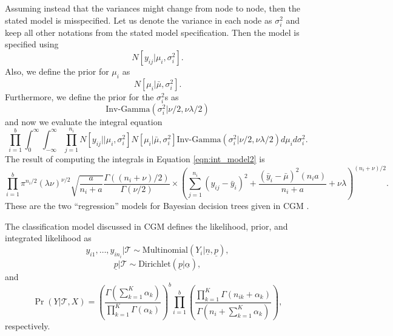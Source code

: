 \documentclass{article}
\renewcommand{\vec}[1]{\underline{{#1}}}
\begin{document}
Assuming instead that the variances might change from node to node, then the stated model is misspecified. Let us denote the variance in each node as $\sigma_i^2$ and keep all other notations from the stated model specification. Then the model is specified using 
\begin{equation}\label{eqn:normal_likelihood_many_variance}
N[y_{ij} \vert \mu_i, \sigma_i^2].
\end{equation}
Also, we define the prior for $\mu_i$ as 
\begin{equation}\label{eqn:multi_variance_prior}
N[\mu_i\vert \bar{\mu}, \sigma_i^2 ].
\end{equation}
Furthermore, we define the prior for the $\sigma_i^2$s as 
\begin{equation}\label{eqn:sigma_priors}
\text{Inv-Gamma}(\sigma_i^2\vert\nu/2, \nu\lambda/2)
\end{equation}
 and now we evaluate the integral equation 
 \begin{equation}\label{eqn:int_model2}
\prod_{i=1}^b \int_0^\infty \int_{-\infty}^{\infty} \prod_{j=1}^{n_i} N[y_{ij}\vert \vert \mu_i, \sigma_i^2]N[\mu_i\vert \bar{\mu}, \sigma_i^2 ]\text{Inv-Gamma}(\sigma_i^2\vert \nu/2, \nu\lambda/2)d\mu_id\sigma_i^2. 
\end{equation}
The result of computing the integrals in Equation \ref{eqn:int_model2} is 
\begin{equation}\label{eqn:int_model3}
\prod_{i=1}^b\pi^{n_i/2}(\lambda\nu)^{\nu/2}\sqrt{\frac{a}{n_i+a}}\frac{\Gamma((n_i+\nu)/2)}{\Gamma(\nu/2)}\times \left( \sum_{j=1}^{n_{i}}(y_{ij}-\bar{y}_i)^2+ \frac{(\bar{y}_i -\bar{\mu})^2(n_ia)}{n_i+a}+\nu\lambda  \right)^{(n_i+\nu)/2}.
\end{equation}
These are the two ``regression'' models  for Bayesian decision trees given in CGM \cite{chipman1998bayesian}. 

The classification model discussed in CGM \cite{chipman1998bayesian} defines the likelihood, prior, and integrated likelihood as
\begin{equation}
y_{i1}, \dots, y_{in_i} \vert \mathcal{T} \sim \text{Multinomial}(Y_i \vert \vec{n}, \vec{p}),
\end{equation} 
\begin{equation}
\vec{p} \vert \mathcal{T} \sim \text{Dirichlet}(\vec{p}\vert \vec{\alpha}), 
\end{equation} 
and
\begin{equation}\label{eqn:int_model4}
\Pr(Y\vert \mathcal{T}, X)=\left(\frac{\Gamma(\sum_{k=1}^K\alpha_k)}{\prod_{k=1}^K\Gamma(\alpha_k)} \right)^b \prod_{i=1}^b\left( \frac{\prod_{k=1}^K\Gamma(n_{ik}+\alpha_k)}{\Gamma(n_i +\sum_{k=1}^K\alpha_k)} \right),
\end{equation} 
respectively. 
 
\end{document}
